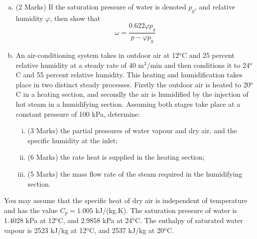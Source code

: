 \documentclass[12pt,twoside]{report}
\newcommand{\frc}{\displaystyle\frac}
\begin{document}
\begin{description}
\begin{enumerate}[(a)]
\item (2 Marks) If the saturation pressure of water is denoted $p_{g}$, and relative humidity $\varphi$, then show that
\begin{displaymath}
\omega = \frc{0.622 \varphi p_{g}}{p-\varphi p_{g}}
\end{displaymath}
\medskip

\item An air-conditioning system takes in outdoor air at 12$^{\text{o}}$C and 25 percent relative humidity at a steady rate of 40 m$^{3}$/min and then conditions it to 24$^{\text{o}}$C and 55 percent relative humidity. This heating and humidification takes place in two distinct steady processes. Firstly the outdoor air is heated to 20$^{\text{o}}$C in a heating section, and secondly the air is humidified by the injection of hot steam in a humidifying section. Assuming both stages take place at a constant pressure of 100 kPa, determine:
\begin{enumerate}[(i)]
\item (3 Marks) the partial pressures of water vapour and dry air, and the specific humidity at the inlet;  
\item (6 Marks) the rate heat is supplied in the heating section;  
\item (5 Marks) the mass flow rate of the steam required in the humidifying section.
\end{enumerate}
\medskip
\end{enumerate}
You may assume that the specific heat of dry air is independent of temperature and has the value $C_{p}=1.005$ kJ/(kg.K). The saturation pressure of water is 1.4028 kPa at 12$^{\text{o}}$C, and 2.9858 kPa at 24$^{\text{o}}$C. The enthalpy of saturated water vapour is 2523 kJ/kg at 12$^{\text{o}}$C, and 2537 kJ/kg at 20$^{\text{o}}$C.


\end{description}

%
%
%
%
\end{document}
